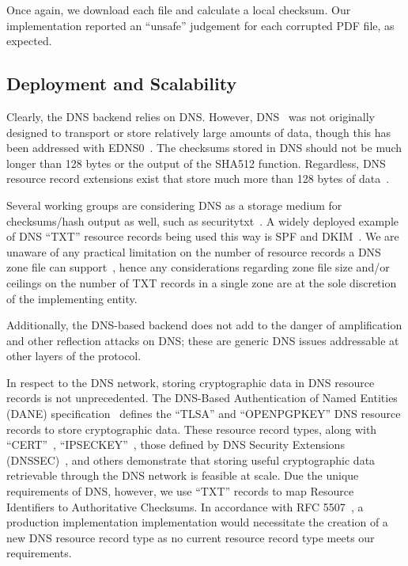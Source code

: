 Once again, we download each file and calculate a local checksum. Our
implementation reported an ``unsafe'' judgement for each corrupted PDF file, as
expected.


\subsection{Deployment and Scalability}


Clearly, the DNS backend relies on DNS. However, DNS~\cite{DNS1} was not
originally designed to transport or store relatively large amounts of data,
though this has been addressed with EDNS0~\cite{EDNS}. The checksums stored in
DNS should not be much longer than 128 bytes or the output of the SHA512
function. Regardless, DNS resource record extensions exist that store much more
than 128 bytes of data~\cite{CERT, IPSECKEY, DANE3, DANE1}.

Several working groups are considering DNS as a storage medium for
checksums/hash output as well, such as securitytxt~\cite{draft-sectxt}. A widely
deployed example of DNS ``TXT'' resource records being used this way is SPF and
DKIM~\cite{DKIM}. We are unaware of any practical limitation on the number of
resource records a DNS zone file can support~\cite{DNS1}, hence any
considerations regarding zone file size and/or ceilings on the number of TXT
records in a single zone are at the sole discretion of the implementing entity.

Additionally, the DNS-based backend does not add to the danger of amplification
and other reflection attacks on DNS; these are generic DNS issues addressable at
other layers of the protocol.


In respect to the DNS network, storing cryptographic data in DNS resource
records is not unprecedented. The DNS-Based Authentication of Named Entities
(DANE) specification~\cite{DANE1, DANE2, DANE3} defines the ``TLSA'' and
``OPENPGPKEY'' DNS resource records to store cryptographic data. These resource
record types, along with ``CERT''~\cite{CERT}, ``IPSECKEY''~\cite{IPSECKEY},
those defined by DNS Security Extensions (DNSSEC)~\cite{DNSSEC}, and others
demonstrate that storing useful cryptographic data retrievable through the DNS
network is feasible at scale. Due the unique requirements of DNS, however, we
use ``TXT'' records to map Resource Identifiers to Authoritative Checksums. In
accordance with RFC 5507~\cite{RFC5507}, a production implementation
implementation would necessitate the creation of a new DNS resource record type
as no current resource record type meets our requirements.

